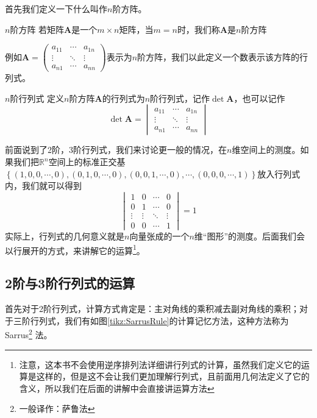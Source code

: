 首先我们定义一下什么叫作$n$阶方阵。

\begin{definition}{$n$阶方阵}
	若矩阵$\mathbf{A}$是一个$m\times n$矩阵，当$m=n$时，我们称$\mathbf{A}$是$n$阶方阵
\end{definition}

例如$\mathbf{A}=\begin{pmatrix}  
	a_{11} & \cdots & a_{1n} \\  
	\vdots & \ddots & \vdots \\  
	a_{n1} & \cdots & a_{nn}  
\end{pmatrix} $表示为$n$阶方阵，我们以此定义一个数表示该方阵的行列式。

\begin{definition}{$n$阶行列式}
	定义$n$阶方阵$\mathbf{A}$的行列式为$n$阶行列式，记作$\det \mathbf{A}$，也可以记作$$\det \mathbf{A}=\begin{vmatrix}  
		a_{11} & \cdots & a_{1n} \\  
		\vdots & \ddots & \vdots \\  
		a_{n1} & \cdots & a_{nn}  
	\end{vmatrix}$$
\end{definition}

前面说到了2阶，3阶行列式，我们来讨论更一般的情况，在$n$维空间上的测度。如果我们把$\mathbb{R}^n$空间上的标准正交基$\left\{ (1,0,0,\cdots,0),(0,1,0,\cdots,0),(0,0,1,\cdots,0),\cdots,(0,0,0,\cdots,1) \right\}$放入行列式内，我们就可以得到$$\begin{vmatrix}
	1 & 0 & \cdots & 0 \\
	0 & 1 & \cdots & 0 \\
	\vdots & \vdots & \ddots & \vdots\\
	0 & 0 & \cdots & 1
\end{vmatrix}=1$$实际上，行列式的几何意义就是$n$向量张成的一个$n$维``图形''的测度。后面我们会以行展开的方式，来讲解它的运算\footnote{注意，这本书不会使用逆序排列法详细讲行列式的计算，虽然我们定义它的运算是这样的，但是这不会让我们更加理解行列式，且前面用几何法定义了它的含义，所以我们在后面的讲解中会直接讲运算方法}。

\subsection{2阶与3阶行列式的运算}

首先对于2阶行列式，计算方式肯定是：主对角线的乘积减去副对角线的乘积；对于三阶行列式，我们有如图\ref{tikz:SarrusRule}的计算记忆方法，这种方法称为 Sarrus\footnote{一般译作：萨鲁法} 法。

